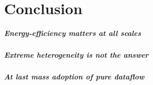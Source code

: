 \chapter{Conclusion}
\label{chapter:conclusion}
\paragraph{Energy-efficiency matters at all scales}
\paragraph{Extreme heterogeneity is not the answer}
\paragraph{At last mass adoption of pure dataflow}